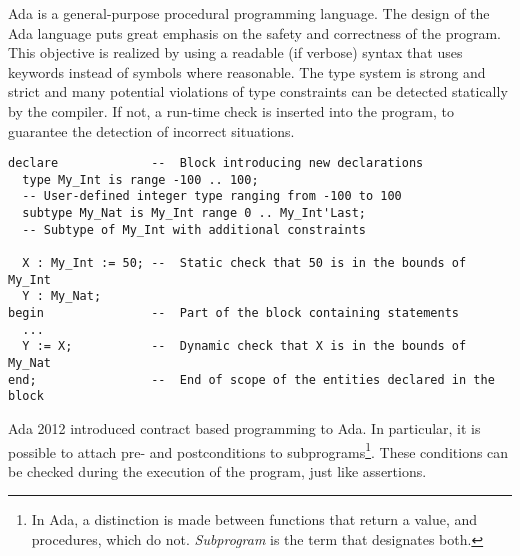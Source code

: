 \documentclass[runningheads]{llncs}
\begin{document}
Ada is a general-purpose procedural programming language. %
The design of the Ada language puts great emphasis on the safety and correctness of the program. This objective is realized by using a readable (if verbose) syntax that uses keywords instead of symbols where reasonable. The type system %
is strong and strict %
and many potential violations of type constraints can be detected statically by the compiler. If not, a run-time check is inserted into the program, to guarantee the detection of incorrect situations. %
\begin{lstlisting}
declare             --  Block introducing new declarations
  type My_Int is range -100 .. 100;
  -- User-defined integer type ranging from -100 to 100
  subtype My_Nat is My_Int range 0 .. My_Int'Last;
  -- Subtype of My_Int with additional constraints

  X : My_Int := 50; --  Static check that 50 is in the bounds of My_Int
  Y : My_Nat;
begin               --  Part of the block containing statements
  ...
  Y := X;           --  Dynamic check that X is in the bounds of My_Nat
end;                --  End of scope of the entities declared in the block
\end{lstlisting}
Ada 2012 %
introduced contract based programming to Ada. In particular, it is possible to attach pre- and postconditions to subprograms\footnote{In Ada, a distinction is made between functions that return a value, and procedures, which do not. \emph{Subprogram} is the term that designates both.}. %
These conditions can be checked during the execution of the program, just like assertions.
\end{document}
